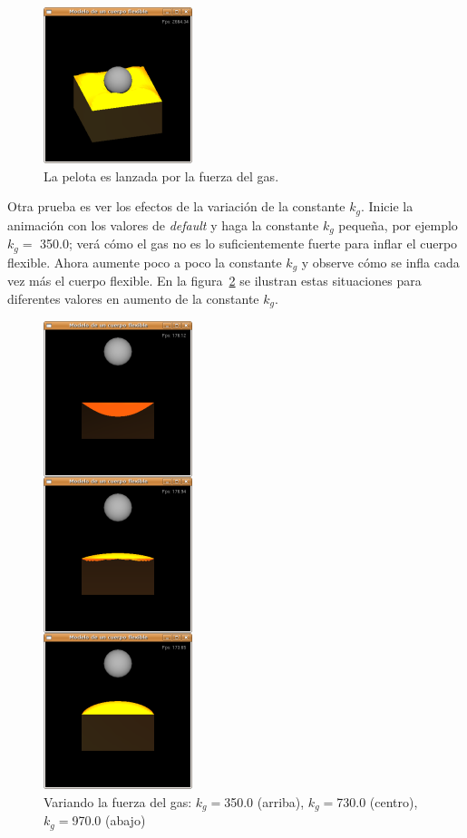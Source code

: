 \begin{figure}
 \centering
 \includegraphics[]{Img/modPres3}
 \caption[Ejecución con la esfera lanzada por la fuerza del gas]{La pelota es lanzada por la fuerza del gas.}
 \label{pres:test3}
\end{figure}

Otra prueba es ver los efectos de la variación de la constante $k_g$. Inicie la animación con los valores de \emph{\foreignlanguage{english}{default}} y haga la constante $k_g$ pequeña, por ejemplo $k_g =$ 350.0; verá cómo el gas no es lo suficientemente fuerte para inflar el cuerpo flexible. Ahora aumente poco a poco la constante $k_g$ y observe cómo se infla cada vez más el cuerpo flexible. En la figura~\ref{pres:test4} se ilustran estas situaciones para diferentes valores en aumento de la constante $k_g$.

\begin{figure}
 \centering
 \includegraphics[]{Img/modPres4}
 \caption[Ejecución con diferentes valores de la constante de gas]{Variando la fuerza del gas: $k_g=$350.0 (arriba), $k_g=$730.0 (centro), $k_g=$970.0 (abajo)}
 \label{pres:test4}
\end{figure}

